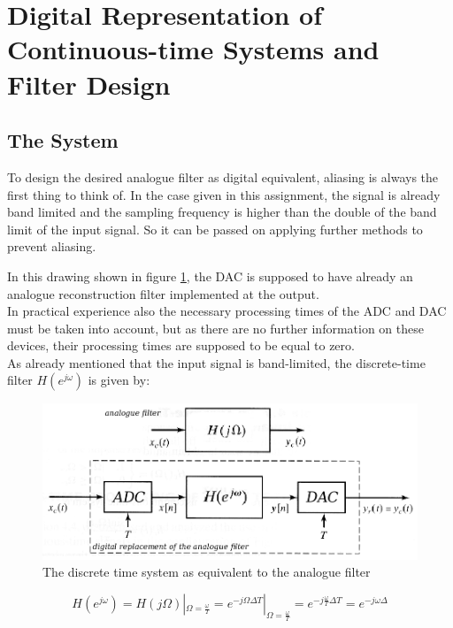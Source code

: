 \section{Digital Representation of Continuous-time Systems and Filter Design} 

\subsection{The System}

To design the desired analogue filter as digital equivalent, aliasing is always the first thing to think of. In the case given in this assignment, the signal is already band limited and the sampling frequency is higher than the double of the band limit of the input signal. So it can be passed on applying further methods to prevent aliasing.


In this drawing shown in figure \ref{fig:draw}, the DAC is supposed to have already an analogue reconstruction filter implemented at the output.\\
In practical experience also the necessary processing times of the ADC and DAC must be taken into account, but as there are no further information on these devices, their processing times are supposed to be equal to zero.\\
As already mentioned that the input signal is band-limited, the discrete-time filter $H(e^{j\omega})$ is given by:

\begin{figure}[h]
\centering
\includegraphics[width=\textwidth]{pics/drawing.png}
\caption{The discrete time system as equivalent to the analogue filter}
\label{fig:draw}
\end{figure}

\begin{equation}
H(e^{j \omega}) = H(j \Omega) |_{\Omega = \frac{\omega}{T}} = e^{-j\Omega \Delta T} |_{\Omega = \frac{\omega}{T}} = e^{-j \frac{\omega}{T} \Delta T} = e^{-j \omega \Delta}
\end{equation}

